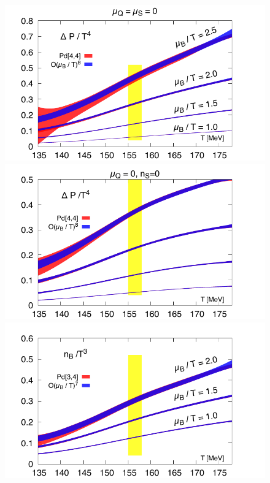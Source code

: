 \documentclass[pdflatex,prd,twocolumn,showpacs,superscriptaddress,nofootinbib]{revtex4-1}
\begin{document}
\begin{figure}[t]
\begin{center}
\includegraphics[scale=0.59]{fig/Temp_BQS000_muB_Order_pd.pdf}
\includegraphics[scale=0.59]{fig/Temp_BQS000_muB_Order_pd_r05.pdf}
\includegraphics[scale=0.59]{fig/Temp_BQS100_muB_Order_pd.pdf}

\end{center}
\end{figure}
\end{document}
